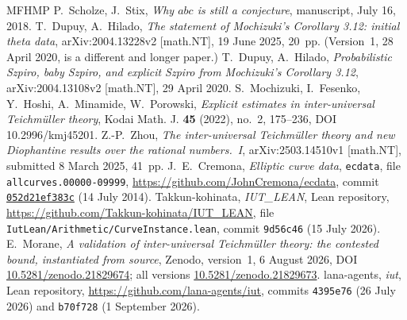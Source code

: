\documentclass[11pt]{article}
\theoremstyle{plain}
\theoremstyle{definition}
\begin{document}
\begin{thebibliography}{MFHMP}
 P.~Scholze, J.~Stix, \emph{Why $abc$ is still a conjecture},
 manuscript, July 16, 2018.
 T.~Dupuy, A.~Hilado, \emph{The statement of Mochizuki's
 Corollary 3.12: initial theta data}, arXiv:2004.13228v2 [math.NT], 19 June 2025,
 20~pp.  (Version~1, 28 April 2020, is a different and longer paper.)
 T.~Dupuy, A.~Hilado, \emph{Probabilistic Szpiro, baby Szpiro,
 and explicit Szpiro from Mochizuki's Corollary 3.12}, arXiv:2004.13108v2 [math.NT],
 29 April 2020.
 S.~Mochizuki, I.~Fesenko, Y.~Hoshi, A.~Minamide,
 W.~Porowski, \emph{Explicit estimates in inter-universal Teichm\"uller theory},
 Kodai Math. J. \textbf{45} (2022), no.~2, 175--236, DOI 10.2996/kmj45201.
 Z.-P.~Zhou,
\emph{The inter-universal Teichm\"uller theory and new Diophantine
results over the rational numbers.~I},
arXiv:2503.14510v1 [math.NT], submitted 8 March 2025, 41~pp.
 J.~E.~Cremona,
\emph{Elliptic curve data}, \texttt{ecdata},
file \texttt{allcurves.00000-09999},
\url{https://github.com/JohnCremona/ecdata}, commit
\href{https://github.com/JohnCremona/ecdata/tree/052d21ef383c1416dd98017c9ae55158822d29ac}{\texttt{052d21ef383c}}
(14 July 2014).
 Takkun-kohinata, \emph{IUT\_LEAN}, Lean repository,
 \url{https://github.com/Takkun-kohinata/IUT_LEAN}, file
 \texttt{IutLean/Arithmetic/CurveInstance.lean}, commit \texttt{9d56c46}
 (15 July 2026).
 E.~Morane, \emph{A validation of inter-universal Teichm\"uller
 theory: the contested bound, instantiated from source}, Zenodo, version~1,
 6 August 2026, DOI \href{https://doi.org/10.5281/zenodo.21829674}{10.5281/zenodo.21829674};
 all versions \href{https://doi.org/10.5281/zenodo.21829673}{10.5281/zenodo.21829673}.
 lana-agents, \emph{iut}, Lean repository,
 \url{https://github.com/lana-agents/iut}, commits \texttt{4395e76} (26 July 2026)
 and \texttt{b70f728} (1 September 2026).
\end{thebibliography}
\end{document}
